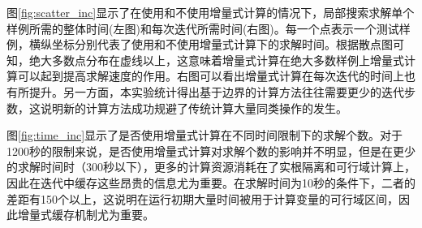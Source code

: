 图\ref{fig:scatter_inc}显示了在使用和不使用增量式计算的情况下，局部搜索求解单个样例所需的整体时间(左图)和每次迭代所需时间(右图)。每一个点表示一个测试样例，横纵坐标分别代表了使用和不使用增量式计算下的求解时间。根据散点图可知，绝大多数点分布在虚线以上，这意味着增量式计算在绝大多数样例上增量式计算可以起到提高求解速度的作用。右图可以看出增量式计算在每次迭代的时间上也有所提升。另一方面，本实验统计得出基于边界的计算方法往往需要更少的迭代步数，这说明新的计算方法成功规避了传统计算大量同类操作的发生。


图\ref{fig:time_inc}显示了是否使用增量式计算在不同时间限制下的求解个数。对于1200秒的限制来说，是否使用增量式计算对求解个数的影响并不明显，但是在更少的求解时间时（300秒以下），更多的计算资源消耗在了实根隔离和可行域计算上，因此在迭代中缓存这些昂贵的信息尤为重要。在求解时间为10秒的条件下，二者的差距有150个以上，这说明在运行初期大量时间被用于计算变量的可行域区间，因此增量式缓存机制尤为重要。

